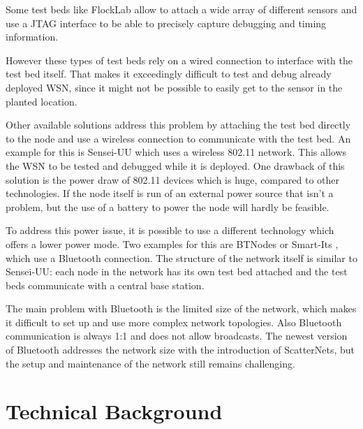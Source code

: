 Some test beds like FlockLab \cite{Lim2013} allow to attach a wide array of different sensors and use a JTAG interface to be able to precisely capture debugging and timing information.
 
However these types of test beds rely on a wired connection to interface with the test bed itself. That makes it exceedingly difficult to test and debug already deployed WSN, since it might not be possible to easily get to the sensor in the planted location.

Other available solutions address this problem by attaching the test bed directly to the node and use a wireless connection to communicate with the test bed. An example for this is Sensei-UU \cite{Rensfelt2009} which uses a wireless 802.11 network. This allows the WSN to be tested and debugged while it is deployed. One drawback of this solution is the power draw of 802.11 devices which is huge, compared to other technologies. If the node itself is run of an external power source that isn't a problem, but the use of a battery to power the node will hardly be feasible.

To address this power issue, it is possible to use a different technology which offers a lower power mode. Two examples for this are BTNodes \cite{Moser} or Smart-Its \cite{Kasten2000}, which use a Bluetooth connection. 
The structure of the network itself is similar to Sensei-UU: each node in the network has its own test bed attached and the test beds communicate with a central base station.

The main problem with Bluetooth is the limited size of the network, which makes it difficult to set up and use more complex network topologies. Also Bluetooth communication is always 1:1 and does not allow broadcasts. The newest version of Bluetooth addresses the network size with the introduction of ScatterNets, but the setup and maintenance of the network still remains challenging.

\chapter{Technical Background}
